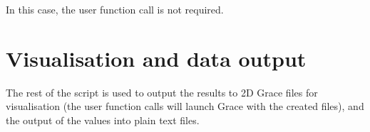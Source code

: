 In this case, the  user function call is not required.



\section{Visualisation and data output}

The rest of the script is used to output the results to 2D Grace files for visualisation (the  user function calls will launch Grace with the created files), and the output of the values into plain text files.
